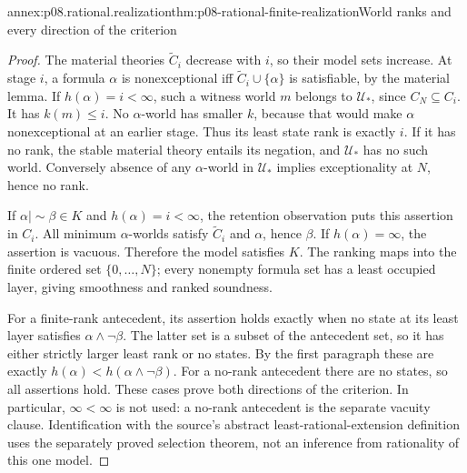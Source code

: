 \begin{annexitem}{annex:p08.rational.realization}{thm:p08-rational-finite-realization}{World ranks and every direction of the criterion}
\begin{proof}
The material theories \(\widetilde C_i\) decrease with \(i\),
so their model sets increase. At stage \(i\), a formula
\(\alpha\) is nonexceptional iff
\(\widetilde C_i\cup\{\alpha\}\) is satisfiable, by the
material lemma. If \(h(\alpha)=i<\infty\), such a witness
world \(m\) belongs to \(\mathcal U_*\), since
\(C_N\subseteq C_i\). It has \(k(m)\leq i\).
No \(\alpha\)-world has smaller \(k\), because that would
make \(\alpha\) nonexceptional at an earlier stage. Thus its
least state rank is exactly \(i\). If it has no rank, the stable
material theory entails its negation, and \(\mathcal U_*\) has
no such world. Conversely absence of any \(\alpha\)-world in
\(\mathcal U_*\) implies exceptionality at \(N\), hence no rank.

If \(\alpha\mathrel{|\!\sim}\beta\in K\) and
\(h(\alpha)=i<\infty\), the retention observation puts this
assertion in \(C_i\). All minimum \(\alpha\)-worlds satisfy
\(\widetilde C_i\) and \(\alpha\), hence \(\beta\).
If \(h(\alpha)=\infty\), the assertion is vacuous. Therefore
the model satisfies \(K\). The ranking maps into the finite
ordered set \(\{0,\ldots,N\}\); every nonempty formula set
has a least occupied layer, giving smoothness and ranked soundness.

For a finite-rank antecedent, its assertion holds exactly when no
state at its least layer satisfies \(\alpha\wedge\neg\beta\).
The latter set is a subset of the antecedent set, so it has either
strictly larger least rank or no states. By the first paragraph these
are exactly \(h(\alpha)<h(\alpha\wedge\neg\beta)\).
For a no-rank antecedent there are no states, so all assertions hold.
These cases prove both directions of the criterion. In particular,
\(\infty<\infty\) is not used: a no-rank antecedent is the
separate vacuity clause. Identification with the source's abstract
least-rational-extension definition uses the separately proved selection
theorem, not an inference from rationality of this one model.
\end{proof}
\end{annexitem}

